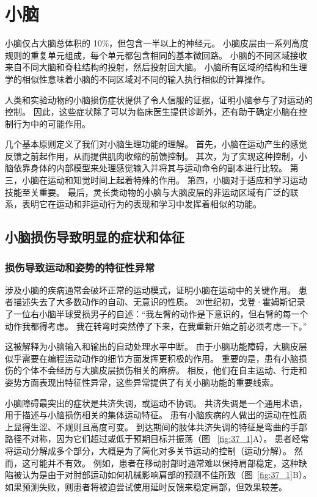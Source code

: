 \chapter{小脑} \label{chap:chap37}

小脑仅占大脑总体积的 10\%，但包含一半以上的神经元。
小脑皮层由一系列高度规则的重复单元组成，每个单元都包含相同的基本微回路。
小脑的不同区域接收来自不同大脑和脊柱结构的投射，然后投射回大脑。
小脑所有区域的结构和生理学的相似性意味着小脑的不同区域对不同的输入执行相似的计算操作。


人类和实验动物的小脑损伤症状提供了令人信服的证据，证明小脑参与了对运动的控制。
因此，这些症状除了可以为临床医生提供诊断外，还有助于确定小脑在控制行为中的可能作用。


几个基本原则定义了我们对小脑生理功能的理解。
首先，小脑在运动产生的感觉反馈之前起作用，从而提供肌肉收缩的前馈控制。
其次，为了实现这种控制，小脑依靠身体的内部模型来处理感觉输入并将其与运动命令的副本进行比较。
第三，小脑在运动和知觉时间上起着特殊的作用。
第四，小脑对于适应和学习运动技能至关重要。
最后，灵长类动物的小脑与大脑皮层的非运动区域有广泛的联系，表明它在运动和非运动行为的表现和学习中发挥着相似的功能。



\section{小脑损伤导致明显的症状和体征}

\subsection{损伤导致运动和姿势的特征性异常}

涉及小脑的疾病通常会破坏正常的运动模式，证明小脑在运动中的关键作用。
患者描述失去了大多数动作的自动、无意识的性质。
20世纪初，戈登·霍姆斯记录了一位右小脑半球受损男子的自述：“我左臂的动作是下意识的，但右臂的每一个动作我都得考虑。
我在转弯时突然停了下来，在我重新开始之前必须考虑一下。”


这被解释为小脑输入和输出的自动处理水平中断。
由于小脑功能障碍，大脑皮层似乎需要在编程运动动作的细节方面发挥更积极的作用。
重要的是，患有小脑损伤的个体不会经历与大脑皮层损伤相关的麻痹。
相反，他们在自主运动、行走和姿势方面表现出特征性异常，这些异常提供了有关小脑功能的重要线索。


小脑障碍最突出的症状是共济失调，或运动不协调。
共济失调是一个通用术语，用于描述与小脑损伤相关的集体运动特征。
患有小脑疾病的人做出的运动在性质上显得生涩、不规则且高度可变。 
到达期间的肢体共济失调的特征是弯曲的手部路径不对称，因为它们超过或低于预期目标并振荡（图 ~\ref{fig:37_1}A）。
患者经常将运动分解成多个部分，大概是为了简化对多关节运动的控制（运动分解）。
然而，这可能并不有效。
例如，患者在移动肘部时通常难以保持肩部稳定，这种缺陷被认为是由于对肘部运动如何机械影响肩部的预测不佳所致（图~\ref{fig:37_1}B）。
如果预测失败，则患者将被迫尝试使用延时反馈来稳定肩部，但效果较差。


